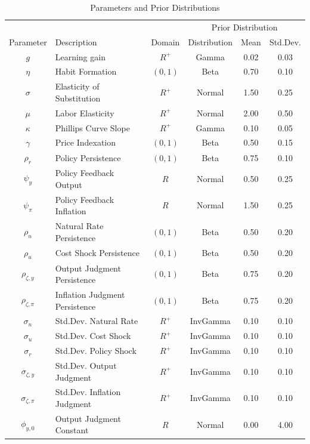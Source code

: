 \documentclass[12pt]{article}
\begin{document}
{\begin{table}
\centering
\caption{Parameters and Prior Distributions}\label{tb:parms}
\begin{center}
\begin{tabular}{c|l|c||c|cc} \hline
\multicolumn{3}{c}{} & \multicolumn{3}{c}{Prior Distribution} \\ 
Parameter & Description & Domain & Distribution & Mean & Std.Dev. \\ \hline 
$g$ & Learning gain & $R^{+}$ & Gamma & 0.02 & 0.03 \\ 
$\eta$ & Habit Formation & $(0,1)$ & Beta & 0.70 & 0.10 \\ 
$\sigma$ & Elasticity of Substitution & $R^{+}$ & Normal & 1.50 & 0.25 \\ 
$\mu$ & Labor Elasticity & $R^{+}$ & Normal & 2.00 & 0.50 \\ 
$\kappa$ & Phillips Curve Slope & $R^{+}$ & Gamma & 0.10 & 0.05 \\ 
$\gamma$ & Price Indexation & $(0,1)$ & Beta & 0.50 & 0.15 \\ 
$\rho_r$ & Policy Persistence & $(0,1)$ & Beta & 0.75 & 0.10 \\ 
$\psi_y$ & Policy Feedback Output & $R$ & Normal & 0.50 & 0.25 \\ 
$\psi_{\pi}$ & Policy Feedback Inflation & $R$ & Normal & 1.50 & 0.25 \\ 
$\rho_n$ & Natural Rate Persistence & $(0,1)$ & Beta & 0.50 & 0.20 \\ 
$\rho_u$ & Cost Shock Persistence & $(0,1)$ & Beta & 0.50 & 0.20 \\ 
$\rho_{\zeta,y}$ & Output Judgment Persistence & $(0,1)$ & Beta & 0.75 & 0.20 \\ 
$\rho_{\zeta,\pi}$ & Inflation Judgment Persistence & $(0,1)$ & Beta & 0.75 & 0.20 \\ 
$\sigma_{n}$ & Std.Dev. Natural Rate & $R^{+}$ & InvGamma & 0.10 & 0.10 \\ 
$\sigma_{u}$ & Std.Dev. Cost Shock & $R^{+}$ & InvGamma & 0.10 & 0.10 \\ 
$\sigma_{r}$ & Std.Dev. Policy Shock & $R^{+}$ & InvGamma & 0.10 & 0.10 \\ 
$\sigma_{\zeta,y}$ & Std.Dev. Output Judgment & $R^{+}$ & InvGamma & 0.10 & 0.10 \\ 
$\sigma_{\zeta,\pi}$ & Std.Dev. Inflation Judgment & $R^{+}$ & InvGamma & 0.10 & 0.10 \\ 
$\phi_{y,0}$ & Output Judgment Constant & $R$ & Normal & 0.00 & 4.00 \\ 

\end{tabular}
\end{center}
\end{table}}
\end{document}
